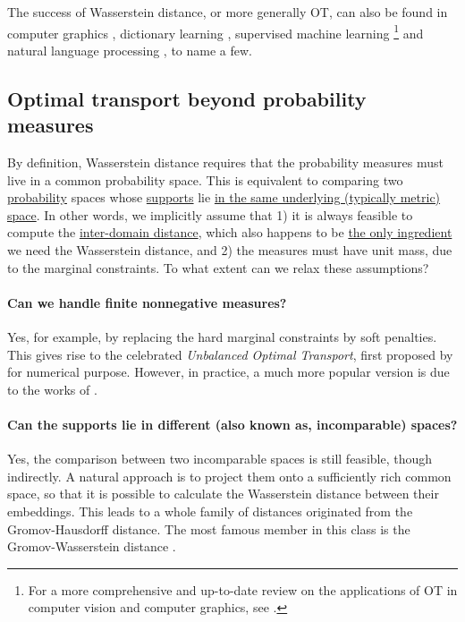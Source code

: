 The success of Wasserstein distance, or more generally OT, can also be found in
computer graphics \citep{Bonneel16,Solomon15}, dictionary learning \citep{Rolet16},
supervised machine learning \citep{Frogner15}
\footnote{For a more comprehensive and up-to-date review on the applications of OT in
computer vision and computer graphics, see \citep{Bonneel23}.} and
natural language processing \citep{Kusner15}, to name a few.

\subsection{Optimal transport beyond probability measures}

By definition, Wasserstein distance requires that the probability measures
must live in a common probability space. This is equivalent to comparing two
\underline{probability} spaces whose \underline{supports} lie
\underline{in the same underlying (typically metric) space}.
In other words, we implicitly assume that 1) it is always feasible to compute
the \underline{inter-domain distance}, which also happens to be \underline{the only ingredient}
we need the Wasserstein distance, and 2) the measures must have unit mass,
due to the marginal constraints. To what extent can we relax these assumptions?

\paragraph{Can we handle finite nonnegative measures?} Yes, for example,
by replacing the hard marginal constraints by soft penalties.
This gives rise to the celebrated \textit{Unbalanced Optimal Transport}, first proposed by
\citet{Benamou03} for numerical purpose. However, in practice, a much more popular version
is due to the works of \citet{Liero18,Frogner15}.

\paragraph{Can the supports lie in different (also known as, incomparable) spaces?}
Yes, the comparison between two incomparable spaces is still feasible, though indirectly.
A natural approach is to project them onto a sufficiently rich common space,
so that it is possible to calculate the Wasserstein distance between their embeddings.
This leads to a whole family of distances originated from the Gromov-Hausdorff distance.
The most famous member in this class is the Gromov-Wasserstein distance \citep{Memoli07,Memoli11}.

